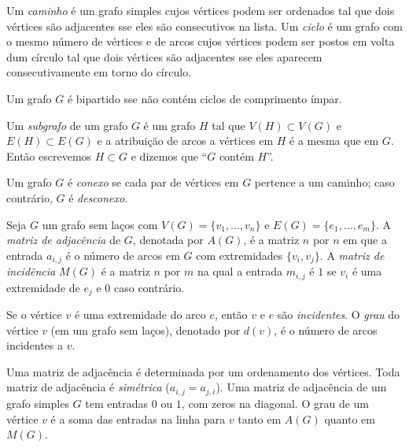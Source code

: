 \documentclass{article}
\begin{document}
\begin{defn}
    Um \emph{caminho} é um grafo simples cujos vértices podem ser ordenados tal que dois vértices são adjacentes sse eles são consecutivos na lista.
    Um \emph{ciclo} é um grafo com o mesmo número de vértices e de arcos cujos vértices podem ser postos em volta dum círculo tal que dois vértices são adjacentes sse eles aparecem consecutivamente em torno do círculo.
\end{defn}

\begin{thm}
    Um grafo \(G\) é bipartido sse não contém ciclos de comprimento ímpar.
\end{thm}

\begin{defn}
    Um \emph{subgrafo} de um grafo \(G\) é um grafo \(H\) tal que \(V(H) \subset V(G)\) e \(E(H) \subset E(G)\) e a atribuição de arcos a vértices em \(H\) é a mesma que em \(G\).
    Então escrevemos \(H \subset G\) e dizemos que ``\(G\) contém \(H\)''.
    
    Um grafo \(G\) é \emph{conexo} se cada par de vértices em \(G\) pertence a um caminho; caso contrário, \(G\) é \emph{desconexo}.
\end{defn}

\begin{defn}
    Seja \(G\) um grafo sem laços com \(V(G) = \{v_1, \ldots, v_n\}\) e \(E(G) = \{e_1, \ldots, e_m\}\). A \emph{matriz de adjacência} de \(G\), denotada por \(A(G)\), é a matriz \(n\) por \(n\) em que a entrada \(a_{i,j}\)
    é o número de arcos em \(G\) com extremidades \(\{v_i, v_j\}\). A \emph{matriz de incidência} \(M(G)\) é a matriz \(n\) por \(m\) na qual a entrada \(m_{i,j}\) é \(1\) se \(v_i\) é uma extremidade de \(e_j\) e 0 caso contrário.

    Se o vértice \(v\) é uma extremidade do arco \(e\), então \(v\) e \(e\) são \emph{incidentes}. O \emph{grau} do vértice \(v\) (em um grafo sem laços), denotado por \(d(v)\), é o número de arcos incidentes a \(v\).
\end{defn}

\begin{rem}
    Uma matriz de adjacência é determinada por um ordenamento dos vértices. Toda matriz de adjacência é \emph{simétrica} (\(a_{i,j}=a_{j,i}\)). Uma matriz de adjacência de um grafo simples \(G\) tem entradas \(0\) ou \(1\), com zeros na diagonal. O grau de um vértice \(v\) é a soma das entradas na linha para \(v\) tanto em \(A(G)\) quanto em \(M(G)\).
\end{rem}
\end{document}
